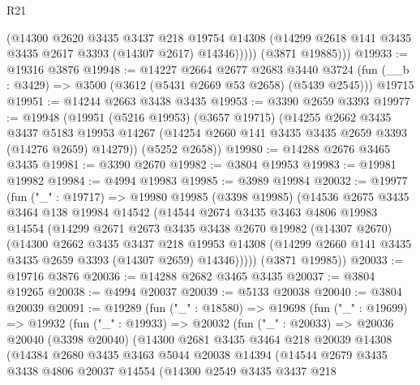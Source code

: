 \begin{lexlean}{R21}
\begin{coremodule}
              (@14300
                @2620
                @3435
                @3437
                @218
                @19754
                @14308
                (@14299 @2618 @141 @3435 @3435 @2617 @3393 (@14307 @2617) @14346)))))
        (@3871 @19885)))
@19933 := @19316 @3876
@19948 := @14227
    @2664
    @2677
    @2683
    @3440
    @3724
    (fun (__b : @3429) => @3500 (@3612 (@5431 @2669 @53 @2658) (@5439 @2545)))
    @19715
@19951 := @14244 @2663 @3438 @3435
@19953 := @3390 @2659 @3393
@19977 := @19948
    (@19951
      (@5216 @19953)
      (@3657 @19715)
      (@14255
        @2662
        @3435
        @3437
        @5183
        @19953
        @14267
        (@14254 @2660 @141 @3435 @3435 @2659 @3393 (@14276 @2659) @14279))
      (@5252 @2658))
@19980 := @14288 @2676 @3465 @3435
@19981 := @3390 @2670
@19982 := @3804 @19953
@19983 := @19981 @19982
@19984 := @4994 @19983
@19985 := @3989 @19984
@20032 := @19977
    (fun ("_" : @19717) =>
    @19980
      @19985
      (@3398 @19985)
      (@14536
        @2675
        @3435
        @3464
        @138
        @19984
        @14542
        (@14544
          @2674
          @3435
          @3463
          @4806
          @19983
          @14554
          (@14299
            @2671
            @2673
            @3435
            @3438
            @2670
            @19982
            (@14307 @2670)
            (@14300
              @2662
              @3435
              @3437
              @218
              @19953
              @14308
              (@14299 @2660 @141 @3435 @3435 @2659 @3393 (@14307 @2659) @14346)))))
      (@3871 @19985))
@20033 := @19716 @3876
@20036 := @14288 @2682 @3465 @3435
@20037 := @3804 @19265
@20038 := @4994 @20037
@20039 := @5133 @20038
@20040 := @3804 @20039
@20091 := @19289
    (fun ("_" : @18580) =>
    @19698
      (fun ("_" : @19699) =>
      @19932
        (fun ("_" : @19933) =>
        @20032
          (fun ("_" : @20033) =>
          @20036
            @20040
            (@3398 @20040)
            (@14300
              @2681
              @3435
              @3464
              @218
              @20039
              @14308
              (@14384
                @2680
                @3435
                @3463
                @5044
                @20038
                @14394
                (@14544
                  @2679
                  @3435
                  @3438
                  @4806
                  @20037
                  @14554
                  (@14300
                    @2549
                    @3435
                    @3437
                    @218

\end{coremodule}
\end{lexlean}
